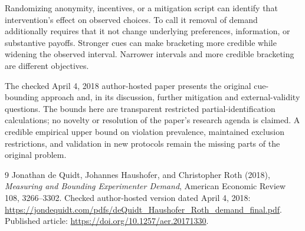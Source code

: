 \documentclass[11pt]{article}
\begin{document}
Randomizing anonymity, incentives, or a mitigation script can identify
that intervention's effect on observed choices. To call it removal of
demand additionally requires that it not change underlying preferences,
information, or substantive payoffs. Stronger cues can make bracketing
more credible while widening the observed interval. Narrower intervals
and more credible bracketing are different objectives.

The checked April 4, 2018 author-hosted paper presents the original
cue-bounding approach and, in its discussion, further mitigation and
external-validity questions. The bounds here are transparent restricted
partial-identification calculations; no novelty or resolution of the
paper's research agenda is claimed. A credible empirical upper bound on
violation prevalence, maintained exclusion restrictions, and validation in
new protocols remain the missing parts of the original problem.

\begin{thebibliography}{9}
 Jonathan de Quidt, Johannes Haushofer, and Christopher Roth
(2018), \emph{Measuring and Bounding Experimenter Demand}, American
Economic Review 108, 3266--3302. Checked author-hosted version dated
April 4, 2018:
\url{https://jondequidt.com/pdfs/deQuidt_Haushofer_Roth_demand_final.pdf}.
Published article: \url{https://doi.org/10.1257/aer.20171330}.
\end{thebibliography}
\end{document}
